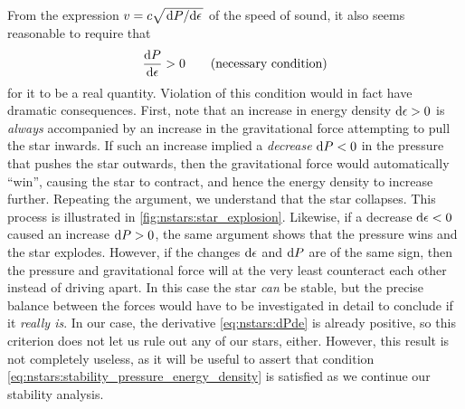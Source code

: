 From the expression $v = c \sqrt{\odv{P}/{\epsilon}}$ of the speed of sound, it also seems reasonable to require that
\begin{equation}
	\odv{P}{\epsilon} > 0
	\qquad \text{(necessary condition)}
\label{eq:nstars:stability_pressure_energy_density}
\end{equation}
for it to be a real quantity.
Violation of this condition would in fact have dramatic consequences.
First, note that an increase in energy density $\mathop{}\!\mathrm{d} \epsilon > 0$ is \emph{always} accompanied by an increase in the gravitational force attempting to pull the star inwards.
If such an increase implied a \emph{decrease} $\mathop{}\!\mathrm{d} P < 0$ in the pressure that pushes the star outwards, then the gravitational force would automatically ``win'', causing the star to contract, and hence the energy density to increase further.
Repeating the argument, we understand that the star collapses.
This process is illustrated in \cref{fig:nstars:star_explosion}.
Likewise, if a decrease $\mathop{}\!\mathrm{d} \epsilon < 0$ caused an increase $\mathop{}\!\mathrm{d} P > 0$, the same argument shows that the pressure wins and the star explodes.
However, if the changes $\mathop{}\!\mathrm{d} \epsilon$ and $\mathop{}\!\mathrm{d} P$ are of the same sign, then the pressure and gravitational force will at the very least counteract each other instead of driving apart.
In this case the star \emph{can} be stable, but the precise balance between the forces would have to be investigated in detail to conclude if it \emph{really is}.
In our case, the derivative \eqref{eq:nstars:dPde} is already positive, so this criterion does not let us rule out any of our stars, either.
However, this result is not completely useless, as it will be useful to assert that condition \eqref{eq:nstars:stability_pressure_energy_density} is satisfied as we continue our stability analysis.

